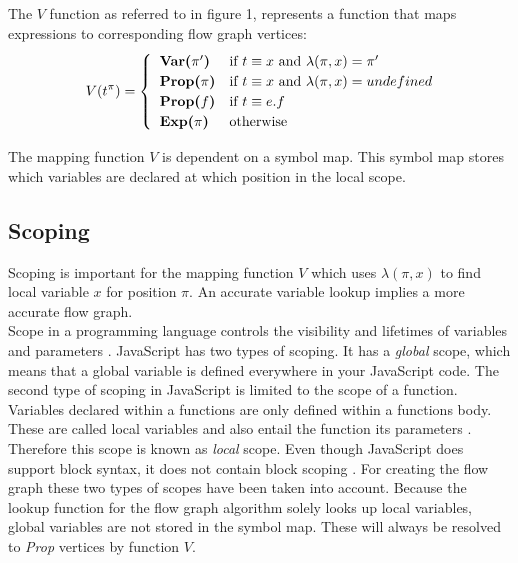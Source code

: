 \documentclass[journal,10pt]{IEEEtran} %
\begin{document}
The $V$ function as referred to in figure 1, represents a function that maps expressions to corresponding flow graph vertices:
\begin{equation*}
  V(t^\pi) = \begin{cases}
    \hspace*{0.2cm} \textbf{Var($\pi'$)} & \text{if~} t \equiv x \text{~and~} \lambda(\pi, x) = \pi' \\
    \hspace*{0.2cm} \textbf{Prop($\pi$)} & \text{if~} t \equiv x \text{~and~} \lambda(\pi, x) = undefined\\
    \hspace*{0.2cm} \textbf{Prop($f$)} & \text{if~} t \equiv e.f \\
    \hspace*{0.2cm} \textbf{Exp($\pi$)} &\text{otherwise}
  \end{cases}
\end{equation*}

The mapping function $V$ is dependent on a symbol map. This symbol map stores which variables are declared at which position in the local scope.

\subsection{Scoping}
Scoping is important for the mapping function $V$ which uses $\lambda(\pi, x)$ to find local variable $x$ for position $\pi$. An accurate variable lookup implies a more accurate flow graph. \\ %
Scope in a programming language controls the visibility and lifetimes of variables and parameters \cite[p.36]{Crockford:2008:JGP}. JavaScript has two types of scoping. It has a \textit{global} scope, which means that a global variable is defined everywhere in your JavaScript code. The second type of scoping in
JavaScript is limited to the scope of a function. Variables declared within a functions are only defined within a functions body. These are called local variables and also entail the function its parameters \cite[p.53]{flanagan2011javascript}. Therefore this scope is known as \textit{local} scope. Even though JavaScript does support block syntax, it does not contain block scoping \cite[p.36]{Crockford:2008:JGP}.
For creating the flow graph these two types of scopes have been taken into account. Because the lookup function for the flow graph algorithm solely looks up local variables, global variables are not stored in the symbol map. These will always be resolved to \textit{Prop} vertices by function $V$.
\end{document}

